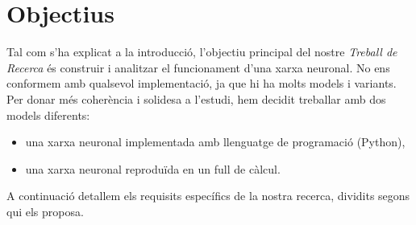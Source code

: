\chapter{Objectius}
\label{c:objectius}

Tal com s’ha explicat a la introducció, l’objectiu principal del nostre \textit{Treball de Recerca} és construir i analitzar el funcionament d’una xarxa neuronal. No ens conformem amb qualsevol implementació, ja que hi ha molts models i variants. Per donar més coherència i solidesa a l’estudi, hem decidit treballar amb dos models diferents:
\begin{itemize}
\item una xarxa neuronal implementada amb llenguatge de programació (Python),
\item una xarxa neuronal reproduïda en un full de càlcul.
\end{itemize}

A continuació detallem els requisits específics de la nostra recerca, dividits segons qui els proposa.

